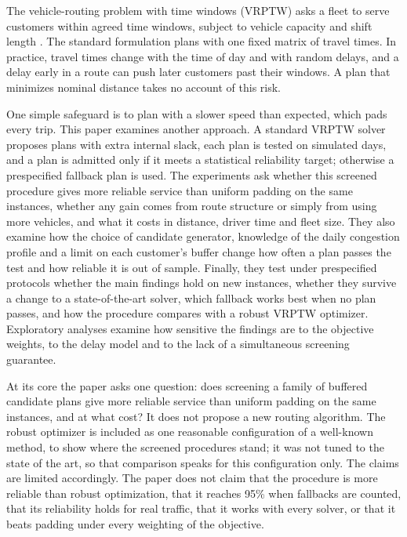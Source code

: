 \documentclass[11pt,a4paper]{article}
\begin{document}
The vehicle-routing problem with time windows (VRPTW) asks a fleet to serve
customers within agreed time windows, subject to vehicle capacity and shift
length \cite{solomon1987,toth2014}. The standard formulation plans with one fixed
matrix of travel times. In practice, travel times change with the time of day and
with random delays, and a delay early in a route can push later customers past
their windows. A plan that minimizes nominal distance takes no account
of this risk.

One simple safeguard is to plan with a slower speed than expected, which pads
every trip. This paper examines another approach. A standard VRPTW solver proposes
plans with extra internal slack, each plan is tested on simulated days, and a plan
is admitted only if it meets a statistical reliability target; otherwise a
prespecified fallback plan is used. The experiments ask
whether this screened procedure gives more reliable service than uniform padding
on the same instances, whether any gain comes from route structure or simply from
using more vehicles, and what it costs in distance, driver time and fleet size.
They also examine how the choice of candidate generator, knowledge of the daily
congestion profile and a limit on each customer's buffer change how often a plan
passes the test and how reliable it is out of sample. Finally, they test under
prespecified protocols whether the main findings hold on new instances, whether
they survive a change to a state-of-the-art solver, which fallback works best
when no plan passes, and how the procedure compares with a robust VRPTW
optimizer. Exploratory analyses examine how sensitive the findings are to the
objective weights, to the delay model and to the lack of a simultaneous screening
guarantee.

At its core the paper asks one question: does screening a family of buffered
candidate plans give more reliable service than uniform padding on the same
instances, and at what cost? It does not propose a new routing algorithm.
The robust optimizer is included as one reasonable configuration of a well-known
method, to show where the screened procedures stand; it was not tuned to the
state of the art, so that comparison speaks for this configuration only. The
claims are limited
accordingly. The paper does not claim that the procedure is more reliable than
robust optimization, that it reaches 95\% when fallbacks are counted, that its
reliability holds for real traffic, that it works with every solver, or that it
beats padding under every weighting of the objective.
\end{document}
